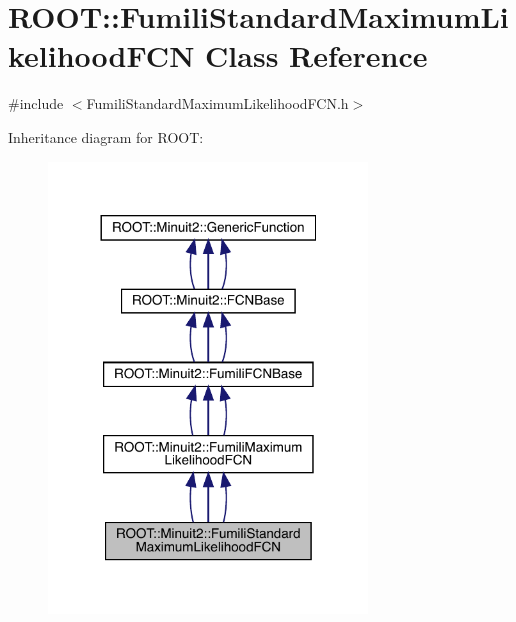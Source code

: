 \hypertarget{classROOT_1_1Minuit2_1_1FumiliStandardMaximumLikelihoodFCN}{}\section{R\+O\+OT\+:\+:Fumili\+Standard\+Maximum\+Likelihood\+F\+CN Class Reference}
\label{classROOT_1_1Minuit2_1_1FumiliStandardMaximumLikelihoodFCN}


{\ttfamily \#include $<$Fumili\+Standard\+Maximum\+Likelihood\+F\+C\+N.\+h$>$}



Inheritance diagram for R\+O\+OT\+:
\nopagebreak
\begin{figure}[H]
\begin{center}
\leavevmode
\includegraphics[width=240pt]{d0/daa/classROOT_1_1Minuit2_1_1FumiliStandardMaximumLikelihoodFCN__inherit__graph}
\end{center}
\end{figure}


